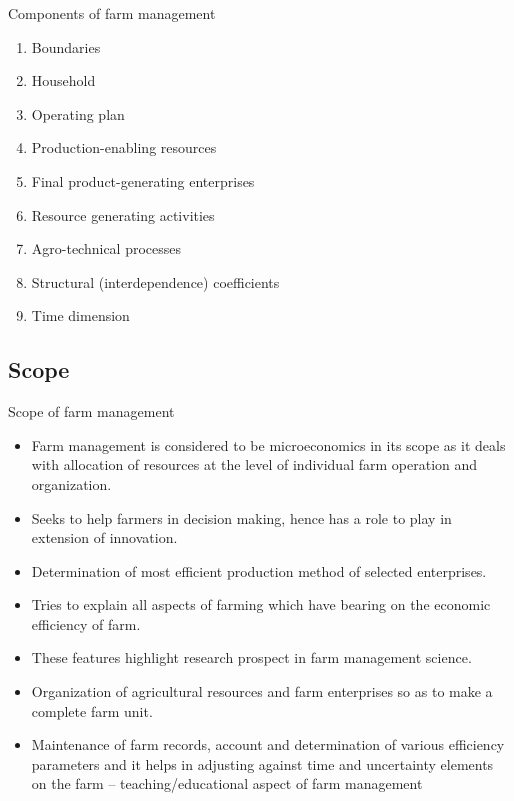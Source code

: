 \documentclass[12pt,ignorenonframetext,aspectratio=169]{beamer}
\providecommand{\tightlist}{%
  \setlength{\itemsep}{0pt}\setlength{\parskip}{0pt}}
\begin{document}
\begin{frame}{Components of farm management}
\protect\hypertarget{components-of-farm-management}{}
\begin{enumerate}
\tightlist
\item
  Boundaries
\item
  Household
\item
  Operating plan
\item
  Production-enabling resources
\item
  Final product-generating enterprises
\item
  Resource generating activities
\item
  Agro-technical processes
\item
  Structural (interdependence) coefficients
\item
  Time dimension
\end{enumerate}
\end{frame}

\hypertarget{scope}{%
\subsection{Scope}\label{scope}}

\begin{frame}{Scope of farm management}
\protect\hypertarget{scope-of-farm-management}{}
\begin{itemize}
\tightlist
\item
  Farm management is considered to be microeconomics in its scope as it
  deals with allocation of resources at the level of individual farm
  operation and organization.
\item
  Seeks to help farmers in decision making, hence has a role to play in
  extension of innovation.
\item
  Determination of most efficient production method of selected
  enterprises.
\item
  Tries to explain all aspects of farming which have bearing on the
  economic efficiency of farm.
\item
  These features highlight research prospect in farm management science.
\item
  Organization of agricultural resources and farm enterprises so as to
  make a complete farm unit.
\item
  Maintenance of farm records, account and determination of various
  efficiency parameters and it helps in adjusting against time and
  uncertainty elements on the farm -- teaching/educational aspect of
  farm management
\end{itemize}
\end{frame}
\end{document}
